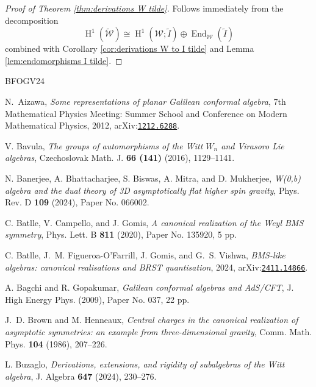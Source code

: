 \documentclass[11pt, svgnames]{amsart}
\DeclareMathOperator{\End}{End}
\newcommand{\W}{\mathcal{W}}
\DeclareMathOperator{\HH}{H}
\theoremstyle{definition}
\newcommand{\etalchar}[1]{$^{#1}$}
\begin{document}
\begin{proof}[Proof of Theorem \ref{thm:derivations W tilde}]
    Follows immediately from the decomposition
    $$\HH^1(\widetilde{\W}) \cong \HH^1(\W;\widetilde{I}) \oplus \End_\W(\widetilde{I})$$
    combined with Corollary \ref{cor:derivations W to I tilde} and Lemma \ref{lem:endomorphisms I tilde}.
\end{proof}

\begin{thebibliography}{BFOGV24}

N.~Aizawa, \emph{{Some representations of planar {G}alilean conformal
  algebra}}, {7th Mathematical Physics Meeting}: {Summer School and Conference
  on Modern Mathematical Physics}, 2012,
  arXiv:\texttt{\href{https://arxiv.org/abs/1212.6288}{1212.6288}}.

V. Bavula, \emph{The groups of automorphisms of the {W}itt {$W_n$} and
  {V}irasoro {L}ie algebras}, Czechoslovak Math. J. \textbf{66 (141)} (2016), 1129--1141.

\bibitem[BBB{\etalchar{+}}24]{BBBM}
N. Banerjee, A. Bhattacharjee, S. Biswas, A. Mitra, and
  D. Mukherjee, \emph{{W(0,b) algebra and the dual theory of 3D
  asymptotically flat higher spin gravity}}, Phys. Rev. D \textbf{109} (2024), Paper No. 066002.

C. Batlle, V. Campello, and J. Gomis, \emph{A canonical
  realization of the {W}eyl {BMS} symmetry}, Phys. Lett. B \textbf{811} (2020),
  Paper No. 135920, 5 pp.

C. Batlle, J.~M. Figueroa-O'Farrill, J. Gomis, and G.~S.
  Vishwa, \emph{BMS-like algebras: canonical realisations and BRST quantisation},
  2024, arXiv:\texttt{\href{https://arxiv.org/abs/2411.14866}{2411.14866}}.

A. Bagchi and R. Gopakumar, \emph{Galilean conformal algebras and
  {A}d{S}/{CFT}}, J. High Energy Phys. (2009), Paper No. 037, 22 pp.

J.~D. Brown and M. Henneaux, \emph{Central charges in the canonical
  realization of asymptotic symmetries: an example from three-dimensional
  gravity}, Comm. Math. Phys. \textbf{104} (1986), 207--226.

L. Buzaglo, \emph{Derivations, extensions, and rigidity of subalgebras of
  the {W}itt algebra}, J. Algebra \textbf{647} (2024), 230--276.


\end{thebibliography}
\end{document}
